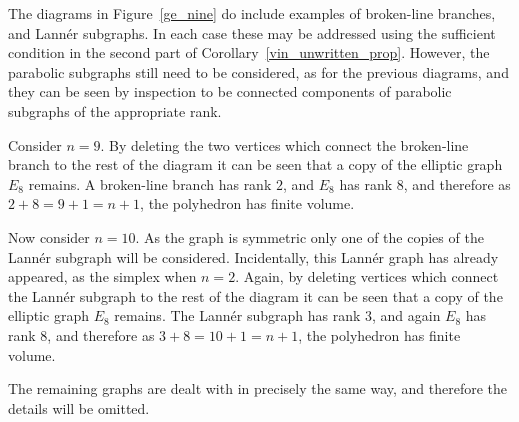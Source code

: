 \documentclass[smallcondensed]{svjour3}                     %
\begin{document}
The diagrams in Figure~\ref{ge_nine} do include examples of broken-line branches, and Lann\'{e}r subgraphs. In each case these may be addressed using the sufficient condition in the second part of Corollary~\ref{vin_unwritten_prop}. However, the parabolic subgraphs still need to be considered, as for the previous diagrams, and they can be seen by inspection to be connected components of parabolic subgraphs of the appropriate rank.

Consider $n=9$. By deleting the two vertices which connect the broken-line branch to the rest of the diagram it can be seen that a copy of the elliptic graph $E_8$ remains. A broken-line branch has rank $2$, and $E_8$ has rank $8$, and therefore as $2+8 = 9 + 1 = n + 1$, the polyhedron has finite volume.

Now consider $n=10$. As the graph is symmetric only one of the copies of the Lann\'{e}r subgraph will be considered. Incidentally, this Lann\'{e}r graph has already appeared, as the simplex when $n=2$.  Again, by deleting vertices which connect the Lann\'{e}r subgraph to the rest of the diagram it can be seen that a copy of the elliptic graph $E_8$ remains. The Lann\'{e}r subgraph has rank $3$, and again $E_8$ has rank $8$, and therefore as $3+8 = 10 + 1 = n+1$, the polyhedron has finite volume.

The remaining graphs are dealt with in precisely the same way, and therefore the details will be omitted.
\end{document}
